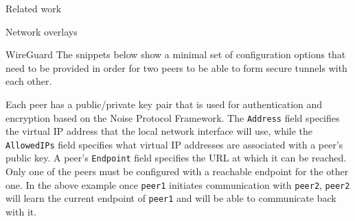 \begin{frame}[fragile]{Related work}
\begin{block}{Network overlays}
\begin{block}{WireGuard}
The snippets below show a minimal set of configuration options that need
to be provided in order for two peers to be able to form secure tunnels
with each other.

\begin{Shaded}
\begin{Highlighting}[]
\KeywordTok{[Interface]}
\OtherTok{=}
\OtherTok{=}\StringTok{ }
\OtherTok{=}

\KeywordTok{[Peer]}
\OtherTok{=}
\OtherTok{=}
\OtherTok{=}
\end{Highlighting}
\end{Shaded}

\begin{Shaded}
\begin{Highlighting}[]
\KeywordTok{[Interface]}
\OtherTok{=}
\OtherTok{=}\StringTok{ }
\OtherTok{=}

\KeywordTok{[Peer]}
\OtherTok{=}
\OtherTok{=}
\end{Highlighting}
\end{Shaded}

Each peer has a public/private key pair that is used for authentication
and encryption based on the Noise Protocol
Framework\autocite{noiseProtocol}. The \texttt{Address} field specifies
the virtual IP address that the local network interface will use, while
the \texttt{AllowedIPs} field specifies what virtual IP addresses are
associated with a peer's public key. A peer's \texttt{Endpoint} field
specifies the URL at which it can be reached. Only one of the peers must
be configured with a reachable endpoint for the other one. In the above
example once \texttt{peer1} initiates communication with \texttt{peer2},
\texttt{peer2} will learn the current endpoint of \texttt{peer1} and
will be able to communicate back with it.
\end{block}


\end{block}
\end{frame}
